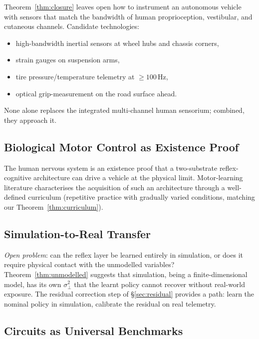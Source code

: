 \documentclass[11pt,twocolumn]{article}
\theoremstyle{definition}
\theoremstyle{remark}
\begin{document}
Theorem~\ref{thm:closure} leaves open how to instrument an autonomous vehicle with sensors that match the bandwidth of human proprioception, vestibular, and cutaneous channels. Candidate technologies:
\begin{itemize}[leftmargin=*,itemsep=2pt]
\item high-bandwidth inertial sensors at wheel hubs and chassis corners,
\item strain gauges on suspension arms,
\item tire pressure/temperature telemetry at $\ge 100\,\mathrm{Hz}$,
\item optical grip-measurement on the road surface ahead.
\end{itemize}

\noindent None alone replaces the integrated multi-channel human sensorium; combined, they approach it.

\subsection{Biological Motor Control as Existence Proof}

The human nervous system is an existence proof that a two-substrate reflex-cognitive architecture can drive a vehicle at the physical limit. Motor-learning literature \cite{shadmehr2005biology,schmidt2019motor,willingham1998motor,doyon2005reorganization} characterises the acquisition of such an architecture through a well-defined curriculum (repetitive practice with gradually varied conditions, matching our Theorem~\ref{thm:curriculum}).

\subsection{Simulation-to-Real Transfer}

\emph{Open problem}: can the reflex layer be learned entirely in simulation, or does it require physical contact with the unmodelled variables? Theorem~\ref{thm:unmodelled} suggests that simulation, being a finite-dimensional model, has its own $\sigma^2_{\perp}$ that the learnt policy cannot recover without real-world exposure. The residual correction step of \S\ref{sec:residual} provides a path: learn the nominal policy in simulation, calibrate the residual on real telemetry.

\subsection{Circuits as Universal Benchmarks}
\end{document}
